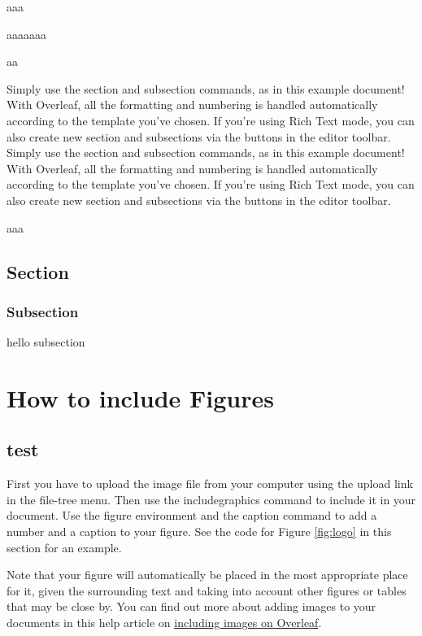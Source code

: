 \begin{example}[aaa]aaa

\end{example}aaaaaaa
\begin{exercise}[aaa]aa

\end{exercise}
\begin{remark}
Simply use the section and subsection commands, as in this example document! With Overleaf, all the formatting and numbering is handled automatically according to the template you've chosen. If you're using Rich Text mode, you can also create new section and subsections via the buttons in the editor toolbar.
Simply use the section and subsection commands, as in this example document! With Overleaf, all the formatting and numbering is handled automatically according to the template you've chosen. If you're using Rich Text mode, you can also create new section and subsections via the buttons in the editor toolbar.
\end{remark}aaa
\section{Section}

\subsection{Subsection}
hello subsection
\chapter{How to include Figures}
\section{test}
First you have to upload the image file from your computer using the upload link in the file-tree menu. Then use the includegraphics command to include it in your document. Use the figure environment and the caption command to add a number and a caption to your figure. See the code for Figure \cref{fig:logo} in this section for an example.

Note that your figure will automatically be placed in the most appropriate place for it, given the surrounding text and taking into account other figures or tables that may be close by. You can find out more about adding images to your documents in this help article on \href{https://www.overleaf.com/learn/how-to/Including_images_on_Overleaf}{including images on Overleaf}.

